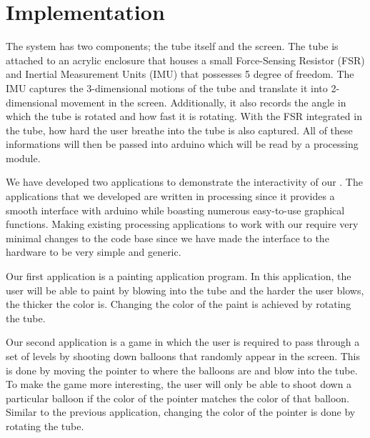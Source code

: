 \section{Implementation}\label{sec:impl}

The \tube system has two components; the tube itself and the screen. The tube is attached to an acrylic enclosure that houses a small Force-Sensing Resistor (FSR) and Inertial Measurement Units (IMU) that possesses 5 degree of freedom. The IMU captures the 3-dimensional motions of the tube and translate it into 2-dimensional movement in the screen. Additionally, it also records the angle in which the tube is rotated and how fast it is rotating. With the FSR integrated in the tube, how hard the user breathe into the tube is also captured. All of these informations will then be passed into arduino which will be read by a processing module.

We have developed two applications to demonstrate the interactivity of our \tube. The applications that we developed are written in processing since it provides a smooth interface with arduino while boasting numerous easy-to-use graphical functions. Making existing processing applications to work with our \tube require very minimal changes to the code base since we have made the interface to the hardware to be very simple and generic.

Our first application is a painting application program. In this application, the user will be able to paint by blowing into the tube and the harder the user blows, the thicker the color is. Changing the color of the paint is achieved by rotating the tube.

Our second application is a game in which the user is required to pass through a set of levels by shooting down balloons that randomly appear in the screen. This is done by moving the pointer to where the balloons are and blow into the tube. To make the game more interesting, the user will only be able to shoot down a particular balloon if the color of the pointer matches the color of that balloon. Similar to the previous application, changing the color of the pointer is done by rotating the tube.


